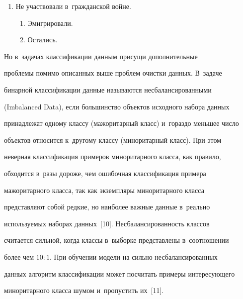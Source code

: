 \begin{enumerate}[1.]
\begin{enumerate}[{2}.1.]
\begin{enumerate}[{2.1.}1.]
    \end{enumerate}


    \item Не участвовали в~гражданской войне.


    \begin{enumerate}[{2.2.}1.]


    \item  Эмигрировали.


        \item Остались.


    \end{enumerate}


    \end{enumerate}


    \end{enumerate}


    


  Но в~задачах классификации данным присущи дополнительные  


проб\-ле\-мы помимо описанных выше проблем очистки данных. В~задаче 


бинарной классификации данные называются несбалансированными 


(Imbalanced Data), если большинство объектов исходного набора данных 


принадлежат одному классу (мажоритарный класс) и~гораздо меньшее число 


объектов относится к~другому классу (миноритарный класс). При этом 


неверная классификация примеров миноритарного класса, как правило, 


обходится в~разы дороже, чем ошибочная классификация примера 


мажоритарного класса, так как экземпляры миноритарного класса 


представляют собой редкие, но наиболее важные данные в~реально 


используемых наборах данных~[10]. Несбалансированность классов 


считается сильной, когда классы в~выборке представлены в~соотношении 


более чем $10:1$. При обуче\-нии модели на сильно несбалансированных 


данных алгоритм классификации может посчитать примеры интересующего 


миноритарного класса шумом и~пропустить их~[11].


